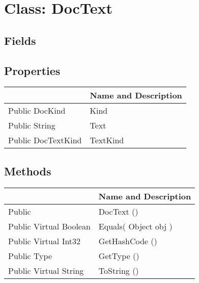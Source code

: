 \documentclass[11pt, oneside, a4paper]{book}
\begin{document}
\hypertarget{SoftwareEngineeringTools.{}Documentation.{}DocText}{}
\section{Class: DocText}

\subsection{Fields}

\subsection{Properties}
\begin{center}
\begin{tabular}{| p{3cm} | p{12cm} | }
\hline
\textbf{ } & \textbf{ Name and Description}\\
\hline
 Public  DocKind &  Kind\hypertarget{SoftwareEngineeringTools.{}Documentation.{}DocText.{}Kind}{}\\
\hline
 Public  String &  Text\hypertarget{SoftwareEngineeringTools.{}Documentation.{}DocText.{}Text}{}\\
\hline
 Public  DocTextKind &  TextKind\hypertarget{SoftwareEngineeringTools.{}Documentation.{}DocText.{}TextKind}{}\\
\hline
\end{tabular}
\end{center}

\subsection{Methods}
\begin{center}
\begin{tabular}{| p{3cm} | p{12cm} | }
\hline
\textbf{ } & \textbf{ Name and Description}\\
\hline
 Public  &  DocText ()\hypertarget{SoftwareEngineeringTools.{}Documentation.{}DocText.{}DocText}{}\\
\hline
 Public  Virtual  Boolean &  Equals(\hypertarget{SoftwareEngineeringTools.{}Documentation.{}DocText.{}Equals\_Object}{} Object  obj  )\\
\hline
 Public  Virtual  Int32 &  GetHashCode ()\hypertarget{SoftwareEngineeringTools.{}Documentation.{}DocText.{}GetHashCode}{}\\
\hline
 Public  Type &  GetType ()\hypertarget{SoftwareEngineeringTools.{}Documentation.{}DocText.{}GetType}{}\\
\hline
 Public  Virtual  String &  ToString ()\hypertarget{SoftwareEngineeringTools.{}Documentation.{}DocText.{}ToString}{}\\
\hline
\end{tabular}
\end{center}
 
\end{document}
